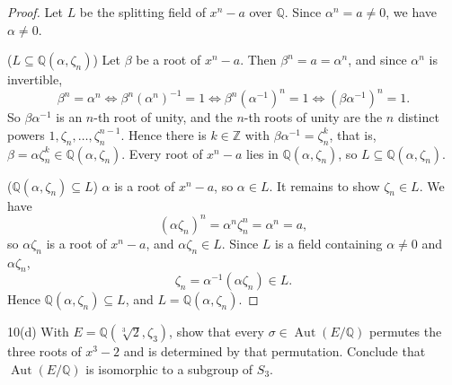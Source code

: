 \documentclass[11pt]{article}
\begin{document}
\begin{proof}
Let $L$ be the splitting field of $x^n - a$ over $\mathbb{Q}$. Since
$\alpha^n = a \ne 0$, we have $\alpha \ne 0$.

($L \subseteq \mathbb{Q}(\alpha, \zeta_n)$) Let $\beta$ be a root of $x^n - a$.
Then $\beta^n = a = \alpha^n$, and since $\alpha^n$ is invertible,
\[
  \beta^n = \alpha^n
  \iff \beta^n (\alpha^n)^{-1} = 1
  \iff \beta^n (\alpha^{-1})^n = 1
  \iff (\beta\alpha^{-1})^n = 1.
\]
So $\beta\alpha^{-1}$ is an $n$-th root of unity, and the $n$-th roots of unity
are the $n$ distinct powers $1, \zeta_n, \dots, \zeta_n^{n-1}$. Hence there is
$k \in \mathbb{Z}$ with $\beta\alpha^{-1} = \zeta_n^k$, that is,
$\beta = \alpha\zeta_n^k \in \mathbb{Q}(\alpha, \zeta_n)$. Every root of
$x^n - a$ lies in $\mathbb{Q}(\alpha, \zeta_n)$, so
$L \subseteq \mathbb{Q}(\alpha, \zeta_n)$.

($\mathbb{Q}(\alpha, \zeta_n) \subseteq L$) $\alpha$ is a root of $x^n - a$, so
$\alpha \in L$. It remains to show $\zeta_n \in L$. We have
\[
  (\alpha\zeta_n)^n = \alpha^n \zeta_n^n = \alpha^n = a,
\]
so $\alpha\zeta_n$ is a root of $x^n - a$, and $\alpha\zeta_n \in L$. Since $L$
is a field containing $\alpha \ne 0$ and $\alpha\zeta_n$,
\[
  \zeta_n = \alpha^{-1}(\alpha\zeta_n) \in L.
\]
Hence $\mathbb{Q}(\alpha, \zeta_n) \subseteq L$, and $L = \mathbb{Q}(\alpha, \zeta_n)$.
\end{proof}

\begin{problem}{10(d)}
  With $E = \mathbb{Q}(\sqrt[3]{2}, \zeta_3)$, show that every
  $\sigma \in \operatorname{Aut}(E/\mathbb{Q})$ permutes the three roots of
  $x^3 - 2$ and is determined by that permutation. Conclude that
  $\operatorname{Aut}(E/\mathbb{Q})$ is isomorphic to a subgroup of $S_3$.
\end{problem}
\end{document}
